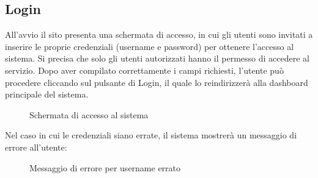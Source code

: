 \subsection{Login}

All'avvio il sito presenta una schermata di accesso, in cui gli utenti sono invitati a inserire le proprie credenziali (username e password) per ottenere l'accesso al sistema. Si precisa che solo gli utenti autorizzati hanno il permesso di accedere al servizio. Dopo aver compilato correttamente i campi richiesti, l'utente può procedere cliccando sul pulsante di Login, il quale lo reindirizzerà alla dashboard principale del sistema.\\
\begin{figure}[H]
    \centering
    \caption{Schermata di accesso al sistema}
    \label{fig:my_label}
\end{figure}
Nel caso in cui le credenziali siano errate, il sistema mostrerà un messaggio di errore all’utente:\\
\begin{figure}[H]
    \centering
    \caption{Messaggio di errore per username errato}
    \label{fig:my_label}
\end{figure}